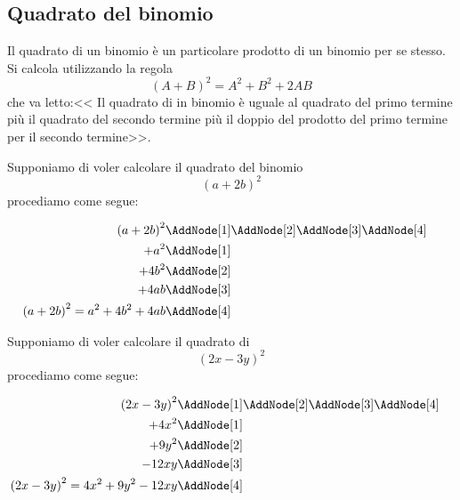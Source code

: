 \subsection{Quadrato del binomio}
Il quadrato di un binomio è un particolare prodotto di un binomio per se stesso. Si calcola utilizzando la regola\[(A+B)^2=A^2+B^2+2AB\] che va letto:<< Il quadrato di in binomio è uguale al quadrato del primo termine più il quadrato del secondo termine più il doppio del prodotto del primo termine per il secondo termine>>. 
\begin{center}

\end{center}
\begin{esempio}
Supponiamo di voler calcolare il quadrato del binomio \[\left(a+2b\right)^2 \]
procediamo come segue:
\begin{NodesList}
	\begin{align*}
		\left(a+2b\right)^2&\AddNode[1]\AddNode[2]\AddNode[3]\AddNode[4]\\
		+a^2&\AddNode[1]&\\ 
		+4b^2&\AddNode[2]&\\
		+4ab&\AddNode[3]\\
		\left(a+2b\right)^2=a^2+4b^2+4ab&\AddNode[4]
	\end{align*}
\end{NodesList}
\end{esempio}
\begin{esempio}
Supponiamo di voler calcolare il quadrato di \[ \left(2x-3y\right)^2\]
procediamo come segue:
\begin{NodesList}
	\begin{align*}
		\left(2x-3y\right)^2&\AddNode[1]\AddNode[2]\AddNode[3]\AddNode[4]\\
		+4x^2&\AddNode[1]&\\ 
		+9y^2&\AddNode[2]&\\
		-12xy&\AddNode[3]\\
		\left(2x-3y\right)^2=4x^2+9y^2-12xy&\AddNode[4]
	\end{align*}
\end{NodesList}
\end{esempio}
